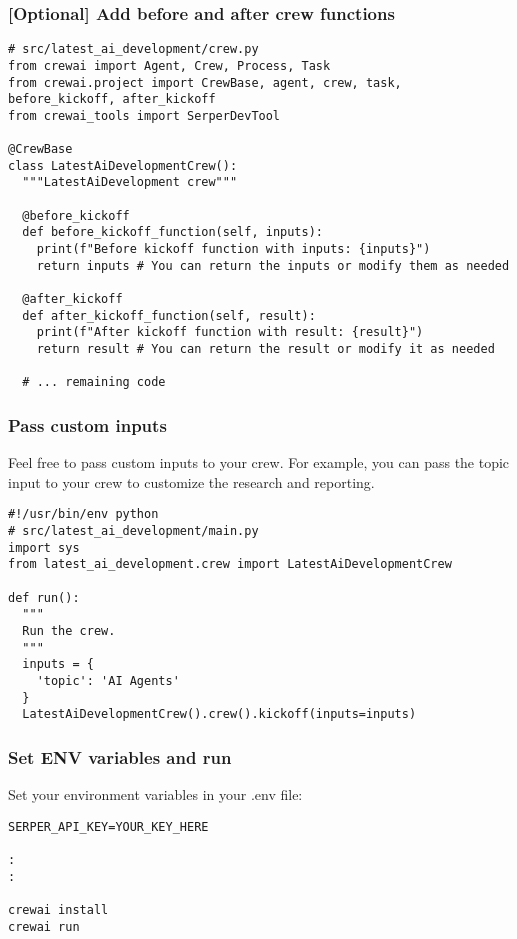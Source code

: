 \begin{frame}[fragile]\frametitle{[Optional] Add before and after crew functions}


    \begin{lstlisting}
# src/latest_ai_development/crew.py
from crewai import Agent, Crew, Process, Task
from crewai.project import CrewBase, agent, crew, task, before_kickoff, after_kickoff
from crewai_tools import SerperDevTool

@CrewBase
class LatestAiDevelopmentCrew():
  """LatestAiDevelopment crew"""

  @before_kickoff
  def before_kickoff_function(self, inputs):
    print(f"Before kickoff function with inputs: {inputs}")
    return inputs # You can return the inputs or modify them as needed

  @after_kickoff
  def after_kickoff_function(self, result):
    print(f"After kickoff function with result: {result}")
    return result # You can return the result or modify it as needed

  # ... remaining code
    \end{lstlisting}	
\end{frame}

\begin{frame}[fragile]\frametitle{Pass custom inputs}

Feel free to pass custom inputs to your crew. For example, you can pass the topic input to your crew to customize the research and reporting.
    \begin{lstlisting}
#!/usr/bin/env python
# src/latest_ai_development/main.py
import sys
from latest_ai_development.crew import LatestAiDevelopmentCrew

def run():
  """
  Run the crew.
  """
  inputs = {
    'topic': 'AI Agents'
  }
  LatestAiDevelopmentCrew().crew().kickoff(inputs=inputs)
    \end{lstlisting}	
\end{frame}

\begin{frame}[fragile]\frametitle{Set ENV variables and run}

Set your environment variables in your .env file:
    \begin{lstlisting}
SERPER_API_KEY=YOUR_KEY_HERE

:
:

crewai install
crewai run
    \end{lstlisting}	
\end{frame}

